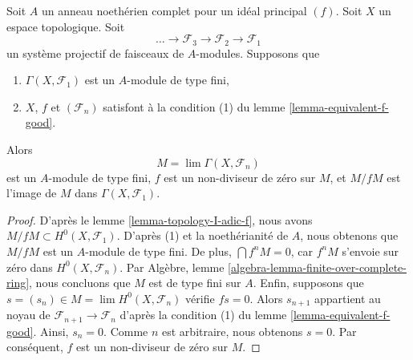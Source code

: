 \begin{lemma}

\label{lemma-limit-finite}

Soit $A$ un anneau noethérien complet pour un idéal principal $(f)$. Soit $X$ un espace topologique. Soit
$$
\ldots \to \mathcal{F}_3 \to \mathcal{F}_2 \to \mathcal{F}_1
$$
un système projectif de faisceaux de $A$-modules. Supposons que

\begin{enumerate}

\item $\Gamma(X, \mathcal{F}_1)$ est un $A$-module de type fini,
\item $X$, $f$ et $(\mathcal{F}_n)$ satisfont à la condition (1) du lemme \ref{lemma-equivalent-f-good}.

\end{enumerate}

Alors
$$
M = \lim \Gamma(X, \mathcal{F}_n)
$$
est un $A$-module de type fini, $f$ est un non-diviseur de zéro sur $M$, et
$M/fM$ est l'image de $M$ dans $\Gamma(X, \mathcal{F}_1)$.

\end{lemma}

\begin{proof}

D'après le lemme \ref{lemma-topology-I-adic-f}, nous avons
$M/fM \subset H^0(X, \mathcal{F}_1)$. D'après (1) et la noethérianité de $A$, nous obtenons que $M/fM$ est un $A$-module de type fini. De plus, $\bigcap f^nM = 0$, car $f^nM$ s'envoie sur zéro dans
$H^0(X, \mathcal{F}_n)$. Par Algèbre, lemme \ref{algebra-lemma-finite-over-complete-ring},
nous concluons que $M$ est de type fini sur $A$. Enfin, supposons que $s = (s_n) \in M = \lim H^0(X, \mathcal{F}_n)$
vérifie $fs = 0$. Alors $s_{n + 1}$ appartient au noyau de
$\mathcal{F}_{n + 1} \to \mathcal{F}_n$ d'après la condition (1) du lemme \ref{lemma-equivalent-f-good}. Ainsi, $s_n = 0$. Comme $n$ est arbitraire, nous obtenons $s = 0$. Par conséquent, $f$ est un non-diviseur de zéro sur $M$.

\end{proof}

